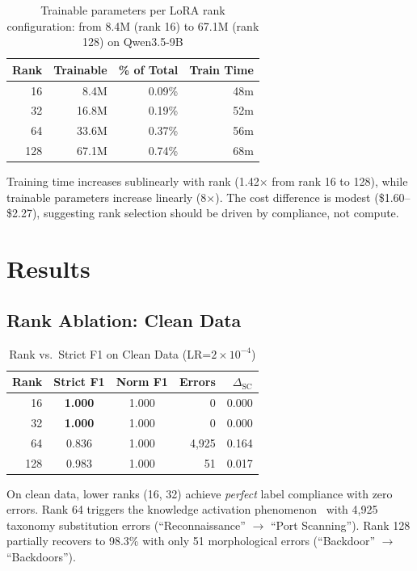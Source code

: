 \documentclass[journal]{IEEEtran}
\begin{document}
\begin{table}[!ht]
\centering
\caption{Trainable parameters per LoRA rank configuration: from 8.4M (rank 16) to 67.1M (rank 128) on Qwen3.5-9B}
\label{tab:params}
\begin{tabular}{rrrr}
\toprule
\textbf{Rank} & \textbf{Trainable} & \textbf{\% of Total} & \textbf{Train Time} \\
\midrule
16 & 8.4M & 0.09\% & 48m \\
32 & 16.8M & 0.19\% & 52m \\
64 & 33.6M & 0.37\% & 56m \\
128 & 67.1M & 0.74\% & 68m \\
\bottomrule
\end{tabular}
\end{table}

Training time increases sublinearly with rank (1.42$\times$ from rank 16 to 128), while trainable parameters increase linearly (8$\times$). The cost difference is modest (\$1.60--\$2.27), suggesting rank selection should be driven by compliance, not compute.

\section{Results}

\subsection{Rank Ablation: Clean Data}

\begin{table}[!ht]
\centering
\caption{Rank vs.\ Strict F1 on Clean Data (LR=$2\times10^{-4}$)}
\label{tab:rank-clean}
\begin{tabular}{rccrr}
\toprule
\textbf{Rank} & \textbf{Strict F1} & \textbf{Norm F1} & \textbf{Errors} & \textbf{$\Delta_\text{SC}$} \\
\midrule
16 & \textbf{1.000} & 1.000 & 0 & 0.000 \\
32 & \textbf{1.000} & 1.000 & 0 & 0.000 \\
64 & 0.836 & 1.000 & 4,925 & 0.164 \\
128 & 0.983 & 1.000 & 51 & 0.017 \\
\bottomrule
\end{tabular}
\end{table}

On clean data, lower ranks (16, 32) achieve \emph{perfect} label compliance with zero errors. Rank 64 triggers the knowledge activation phenomenon~\cite{p6} with 4,925 taxonomy substitution errors (``Reconnaissance'' $\to$ ``Port Scanning''). Rank 128 partially recovers to 98.3\% with only 51 morphological errors (``Backdoor'' $\to$ ``Backdoors'').
\end{document}
